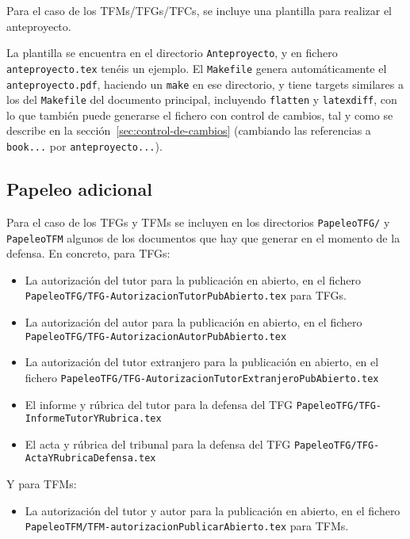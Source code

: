 Para el caso de los TFMs/TFGs/TFCs, se incluye una plantilla para realizar el anteproyecto.

La plantilla se encuentra en el directorio \texttt{Anteproyecto}, y en fichero \texttt{anteproyecto.tex} tenéis un ejemplo. El \texttt{Makefile} genera automáticamente el \texttt{anteproyecto.pdf}, haciendo un \texttt{make} en ese directorio, y tiene targets similares a los del \texttt{Makefile} del documento principal, incluyendo \texttt{flatten} y \texttt{latexdiff}, con lo que también puede generarse el fichero con control de cambios, tal y como se describe en la sección~\ref{sec:control-de-cambios} (cambiando las referencias a \texttt{book...} por \texttt{anteproyecto...}).



\subsection{Papeleo adicional}
\label{sec:introapp1}

Para el caso de los TFGs y TFMs se incluyen en los directorios \texttt{PapeleoTFG/} y \texttt{PapeleoTFM} algunos de los documentos que hay que generar en el momento de la defensa. En concreto, para TFGs:

\begin{itemize}
  \item La autorización del tutor para la publicación en abierto, en el fichero \texttt{PapeleoTFG/TFG-AutorizacionTutorPubAbierto.tex} para TFGs.
  \item La autorización del autor para la publicación en abierto, en el fichero \texttt{PapeleoTFG/TFG-AutorizacionAutorPubAbierto.tex}
  \item La autorización del tutor extranjero para la publicación en abierto, en el fichero \texttt{PapeleoTFG/TFG-AutorizacionTutorExtranjeroPubAbierto.tex}
  \item El informe y rúbrica del tutor para la defensa del TFG \texttt{PapeleoTFG/TFG-InformeTutorYRubrica.tex}
  \item El acta y rúbrica del tribunal para la defensa del TFG \texttt{PapeleoTFG/TFG-ActaYRubricaDefensa.tex}
\end{itemize}

Y para TFMs:

\begin{itemize}
  \item La autorización del tutor y autor para la publicación en abierto, en el fichero \texttt{PapeleoTFM/TFM-autorizacionPublicarAbierto.tex} para TFMs.
\end{itemize}

